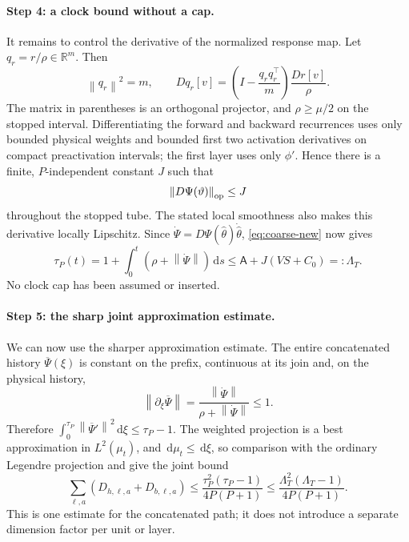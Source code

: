 \documentclass[11pt]{article}
\theoremstyle{definition}
\theoremstyle{remark}
\newcommand{\R}{\mathbb{R}}
\newcommand{\norm}[1]{\left\lVert #1\right\rVert}
\newcommand{\dd}{\,\mathrm{d}}
\begin{document}
\paragraph{Step 4: a clock bound without a cap.}
It remains to control the derivative of the normalized response map.  Let
$q_r=r/\rho\in\R^m$.  Then
\begin{equation}
 \norm{q_r}^2=m,\qquad
 Dq_r[v]=
 \left(I-\frac{q_rq_r^\top}{m}\right)\frac{Dr[v]}{\rho}. \label{eq:normalized-residual-derivative}
\end{equation}
The matrix in parentheses is an orthogonal projector, and $\rho\ge\mu/2$ on the
stopped interval.  Differentiating the forward and backward recurrences uses
only bounded physical weights and bounded first two activation derivatives on
compact preactivation intervals; the first layer uses only $\phi'$.  Hence
there is a finite, $P$-independent constant $J$ such that
\[
 \norm{D\Psi(\vartheta)}_{\rm op}\le J
\]
throughout the stopped tube.  The stated local smoothness also makes this
derivative locally Lipschitz.  Since
$\dot\Psi=D\Psi(\widehat\theta)\dot{\widehat\theta}$, \eqref{eq:coarse-new}
now gives
\begin{equation}
 \tau_P(t)=1+\int_0^t(\rho+\norm{\dot\Psi})\dd s
 \le\mathsf A+J(VS+C_0)=:\Lambda_T.                 \label{eq:new-clock-bound}
\end{equation}
No clock cap has been assumed or inserted.

\paragraph{Step 5: the sharp joint approximation estimate.}
We can now use the sharper approximation estimate.  The entire concatenated
history $\overline\Psi(\xi)$ is constant on the prefix, continuous at its join
and, on the physical history,
\[
 \norm{\partial_\xi\overline\Psi}
 =\frac{\norm{\dot\Psi}}{\rho+\norm{\dot\Psi}}\le1.
\]
Therefore $\int_0^{\tau_P}\norm{\overline\Psi'}^2\dd\xi\le \tau_P-1$.  The weighted
projection is a best approximation in $L^2(\mu_t)$, and $\dd\mu_t\le\dd\xi$, so
comparison with the ordinary Legendre projection and  give
the joint bound
\begin{equation}
 \sum_{\ell,a}(D_{h,\ell,a}+D_{b,\ell,a})
 \le\frac{\tau_P^2(\tau_P-1)}{4P(P+1)}
 \le\frac{\Lambda_T^2(\Lambda_T-1)}{4P(P+1)}.       \label{eq:new-joint-tail}
\end{equation}
This is one estimate for the concatenated path; it does not introduce a
separate dimension factor per unit or layer.
\end{document}
